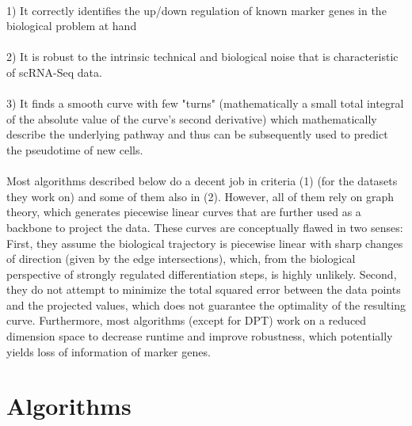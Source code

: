 \documentclass[11pt]{article}
\begin{document}
\\
1) It correctly identifies the up/down regulation of known marker genes in the biological problem at hand\\
\\
2) It is robust to the intrinsic technical and biological noise that is characteristic of scRNA-Seq data. \\
\\
3)  It finds a smooth curve with few "turns" (mathematically a small total integral of the absolute value of the curve's second derivative) which mathematically describe the underlying pathway and thus can be subsequently used to predict the pseudotime of new cells.\\
\\
Most algorithms described below do a decent job in criteria (1) (for the datasets they work on) and some of them also in (2). However, all of them rely on graph theory, which generates piecewise linear curves that are further used as a backbone to project the data. These curves are conceptually flawed in two senses: First, they assume the biological trajectory is piecewise linear with sharp changes of direction (given by the edge intersections), which, from the biological perspective of strongly regulated differentiation steps, is highly unlikely. Second, they do not attempt to minimize the total squared error between the data points and the projected values, which does not guarantee the optimality of the resulting curve. Furthermore, most algorithms (except for DPT) work on a reduced dimension space to decrease runtime and improve robustness, which potentially yields loss of information of marker genes. 

\section{Algorithms}
\end{document}

